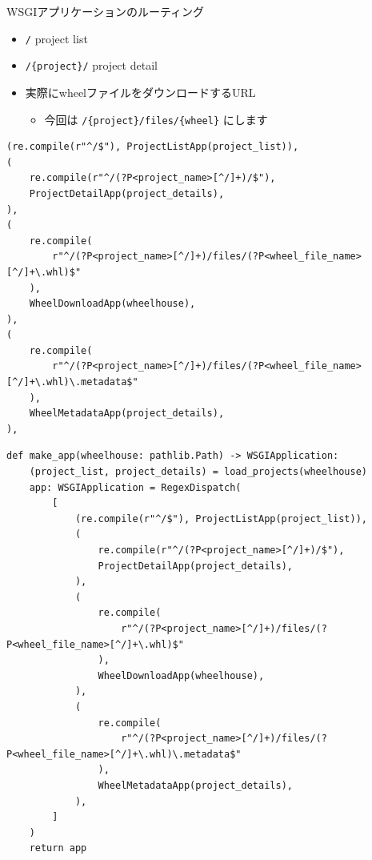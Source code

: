 \documentclass[presentation]{beamer}
\begin{document}
\begin{frame}[label={sec:orga0a9732},fragile]{WSGIアプリケーションのルーティング}
 \begin{itemize}
\item \texttt{/} project list
\item \texttt{/\{project\}/} project detail
\item 実際にwheelファイルをダウンロードするURL
\begin{itemize}
\item 今回は \texttt{/\{project\}/files/\{wheel\}} にします
\end{itemize}
\end{itemize}

\begin{verbatim}
(re.compile(r"^/$"), ProjectListApp(project_list)),
(
    re.compile(r"^/(?P<project_name>[^/]+)/$"),
    ProjectDetailApp(project_details),
),
(
    re.compile(
        r"^/(?P<project_name>[^/]+)/files/(?P<wheel_file_name>[^/]+\.whl)$"
    ),
    WheelDownloadApp(wheelhouse),
),
(
    re.compile(
        r"^/(?P<project_name>[^/]+)/files/(?P<wheel_file_name>[^/]+\.whl)\.metadata$"
    ),
    WheelMetadataApp(project_details),
),
\end{verbatim}
\begin{verbatim}
def make_app(wheelhouse: pathlib.Path) -> WSGIApplication:
    (project_list, project_details) = load_projects(wheelhouse)
    app: WSGIApplication = RegexDispatch(
        [
            (re.compile(r"^/$"), ProjectListApp(project_list)),
            (
                re.compile(r"^/(?P<project_name>[^/]+)/$"),
                ProjectDetailApp(project_details),
            ),
            (
                re.compile(
                    r"^/(?P<project_name>[^/]+)/files/(?P<wheel_file_name>[^/]+\.whl)$"
                ),
                WheelDownloadApp(wheelhouse),
            ),
            (
                re.compile(
                    r"^/(?P<project_name>[^/]+)/files/(?P<wheel_file_name>[^/]+\.whl)\.metadata$"
                ),
                WheelMetadataApp(project_details),
            ),
        ]
    )
    return app
\end{verbatim}
\end{frame}
\end{document}
